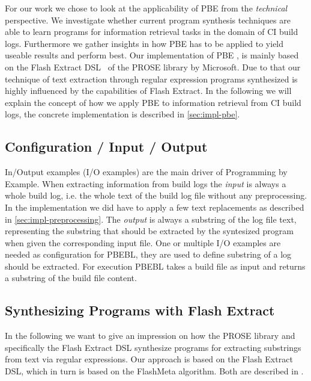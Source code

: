 \documentclass[\myrootdir/main.tex]{subfiles}
\begin{document}
For our work we chose to look at the applicability of PBE from the \emph{technical} perspective.
We investigate whether current program synthesis techniques are able to learn programs for information retrieval tasks in the domain of CI build logs.
Furthermore we gather insights in how PBE has to be applied to yield useable results and perform best.
Our implementation of PBE , is mainly based on the Flash Extract DSL~\cite{flahsextractpaper} of the PROSE library by Microsoft.
Due to that our technique of text extraction through regular expression programs synthesized is highly influenced by the capabilities of Flash Extract.
In the following we will explain the concept of how we apply PBE to information retrieval from CI build logs, the concrete implementation is described in \ref{sec:impl-pbe}.

\subsection*{Configuration / Input / Output}
In/Output examples (I/O examples) are the main driver of Programming by Example.
When extracting information from build logs the \emph{input} is always a whole build log, i.e. the whole text of the build log file without any preprocessing.
In the implementation we did have to apply a few text replacements as described in \ref{sec:impl-preprocessing}.
The \emph{output} is always a substring of the log file text, representing the substring that should be extracted by the syntesized program when given the corresponding input file.
One or multiple I/O examples are needed as configuration for PBEBL, they are used to define substring of a log should be extracted.
For execution PBEBL takes a build file as input and returns a substring of the build file content.

\subsection*{Synthesizing Programs with Flash Extract}
In the following we want to give an impression on how the PROSE library and specifically the Flash Extract DSL synthesize programs for extracting substrings from text via regular expressions.
Our approach is based on the Flash Extract DSL, which in turn is based on the FlashMeta algorithm. Both are described in .
\end{document}
